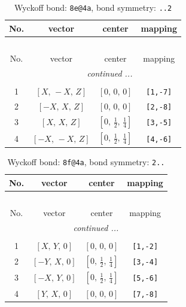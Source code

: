 \documentclass[fleqn,8pt]{jsarticle}
\begin{document}
\renewcommand{\arraystretch}{1.2}
\begin{longtable}{cccc}
\caption{Wyckoff bond: {\tt 8e@4a}, bond symmetry: {\tt ..2}}
 \\
 \hline \hline
No. & vector & center & mapping \\ \hline \endfirsthead

\multicolumn{3}{l}{\tablename\ \thetable{}} \\
 \hline \hline
No. & vector & center & mapping \\ \hline \endhead

 \hline \hline
\multicolumn{3}{r}{\footnotesize\it continued ...} \\ \endfoot

 \hline \hline
\multicolumn{3}{r}{} \\ \endlastfoot

1 & $\left[ X,\, - X,\, Z \right]$ & $\left[ 0,\, 0,\, 0 \right]$ & {\tt [1,-7]} \\ \hline
2 & $\left[ - X,\, X,\, Z \right]$ & $\left[ 0,\, 0,\, 0 \right]$ & {\tt [2,-8]} \\ \hline
3 & $\left[ X,\, X,\, Z \right]$ & $\left[ 0,\, \frac{1}{2},\, \frac{1}{4} \right]$ & {\tt [3,-5]} \\ \hline
4 & $\left[ - X,\, - X,\, Z \right]$ & $\left[ 0,\, \frac{1}{2},\, \frac{1}{4} \right]$ & {\tt [4,-6]} \\
\end{longtable}
\renewcommand{\arraystretch}{1.2}
\begin{longtable}{cccc}
\caption{Wyckoff bond: {\tt 8f@4a}, bond symmetry: {\tt 2..}}
 \\
 \hline \hline
No. & vector & center & mapping \\ \hline \endfirsthead

\multicolumn{3}{l}{\tablename\ \thetable{}} \\
 \hline \hline
No. & vector & center & mapping \\ \hline \endhead

 \hline \hline
\multicolumn{3}{r}{\footnotesize\it continued ...} \\ \endfoot

 \hline \hline
\multicolumn{3}{r}{} \\ \endlastfoot

1 & $\left[ X,\, Y,\, 0 \right]$ & $\left[ 0,\, 0,\, 0 \right]$ & {\tt [1,-2]} \\ \hline
2 & $\left[ - Y,\, X,\, 0 \right]$ & $\left[ 0,\, \frac{1}{2},\, \frac{1}{4} \right]$ & {\tt [3,-4]} \\ \hline
3 & $\left[ - X,\, Y,\, 0 \right]$ & $\left[ 0,\, \frac{1}{2},\, \frac{1}{4} \right]$ & {\tt [5,-6]} \\ \hline
4 & $\left[ Y,\, X,\, 0 \right]$ & $\left[ 0,\, 0,\, 0 \right]$ & {\tt [7,-8]} \\
\end{longtable}
\end{document}
